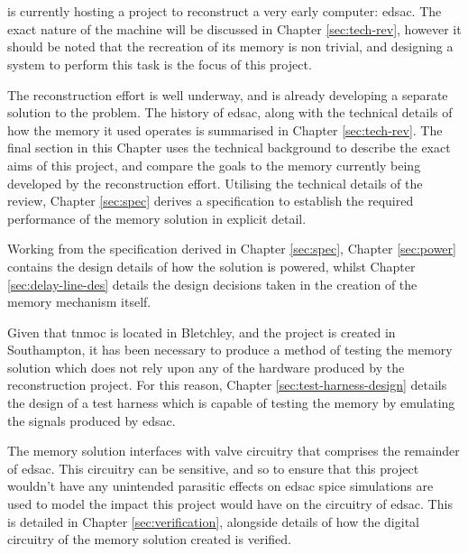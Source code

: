 
\chapter{} \label{sec:intro}
 is currently hosting a project to reconstruct a very early computer: \gls{edsac}. The exact nature of the machine will be discussed in Chapter \ref{sec:tech-rev}, however it should be noted that the recreation of its memory is non trivial, and designing a system to perform this task is the focus of this project.

The reconstruction effort is well underway, and is already developing a separate solution to the problem. The history of \gls{edsac}, along with the technical details of how the memory it used operates is summarised in Chapter \ref{sec:tech-rev}. The final section in this Chapter uses the technical background to describe the exact aims of this project, and compare the goals to the memory currently being developed by the reconstruction effort. Utilising the technical details of the review, Chapter \ref{sec:spec} derives a specification to establish the required performance of the memory solution in explicit detail.

Working from the specification derived in Chapter \ref{sec:spec}, Chapter \ref{sec:power} contains the design details of how the solution is powered, whilst Chapter \ref{sec:delay-line-des} details the design decisions taken in the creation of the memory mechanism itself.

Given that \gls{tnmoc} is located in Bletchley, and the project is created in Southampton, it has been necessary to produce a method of testing the memory solution which does not rely upon any of the hardware produced by the reconstruction project. For this reason, Chapter \ref{sec:test-harness-design} details the design of a test harness which is capable of testing the memory by emulating the signals produced by \gls{edsac}.

The memory solution interfaces with valve circuitry that comprises the remainder of \gls{edsac}. This circuitry can be sensitive, and so to ensure that this project wouldn't have any unintended parasitic effects on \gls{edsac} \gls{spice} simulations are used to model the impact this project would have on the circuitry of \gls{edsac}. This is detailed in Chapter \ref{sec:verification}, alongside details of how the digital circuitry of the memory solution created is verified.

